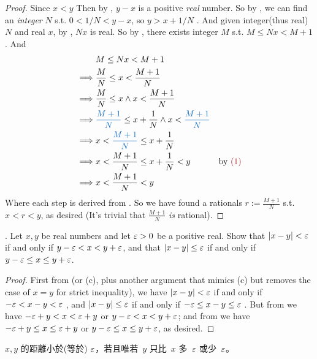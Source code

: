 \begin{proof}
Since \(x < y\) Then by , \(y - x\) is a positive \emph{real} number.
So by , we can find an \emph{integer} \(N\) s.t. \(0 < 1/N < y - x\), so \(y > x + 1/N\) .
And given integer(thus real) \(N\) and real \(x\), by , \(Nx\) is real.
So by , there exists integer \(M\) s.t. \(M \le Nx < M + 1\).
And
\begin{align*}
             & M \le Nx < M + 1 \\
    \implies & \frac{M}{N} \le x < \frac{M + 1}{N} \\
    \implies & \frac{M}{N} \le x \land x < \frac{M + 1}{N} \\
    \implies & \BLUE{\frac{M + 1}{N}} \le x + \frac{1}{N} \land x < \BLUE{\frac{M + 1}{N}} \\
    \implies & x < \BLUE{\frac{M + 1}{N}} \le x + \frac{1}{N} \\
    \implies & x < \frac{M + 1}{N} \le x + \frac{1}{N} < y & \text{by \MAROON{(1)}} \\
    \implies & x < \frac{M + 1}{N} < y
\end{align*}
Where each step is derived from .
So we have found a rationals \(r := \frac{M + 1}{N}\) s.t. \(x < r < y\), as desired (It's trivial that \(\frac{M + 1}{N}\) \emph{is} rational).
\end{proof}

\begin{exercise} \label{exercise 5.4.6}.
Let \(x, y\) be real numbers and let \(\varepsilon > 0\) be a positive real.
Show that \(\lvert x - y\rvert < \varepsilon\) if and only if \(y - \varepsilon < x < y + \varepsilon\),
and that \(\lvert x - y\rvert \le \varepsilon\) if and only if \(y - \varepsilon \le x \le y + \varepsilon\).
\end{exercise}

\begin{proof}
First from  (or (c), plus another argument that mimics (c) but removes the case of \(x = y\) for strict inequality),
we have \(\lvert x - y\rvert < \varepsilon\) if and only if \(-\varepsilon < x - y < \varepsilon\) ,
and \(\lvert x - y\rvert \le \varepsilon\) if and only if \(-\varepsilon \le x - y \le \varepsilon\) .
But from  we have \(-\varepsilon + y < x < \varepsilon + y\) or \(y - \varepsilon < x < y + \varepsilon\);
and from  we have \(-\varepsilon + y \le x \le \varepsilon + y\) or \(y - \varepsilon \le x \le y + \varepsilon\), as desired.
\end{proof}

\begin{note}
\(x, y\) 的距離小於(等於) \(\varepsilon\)，若且唯若\ \(y\) 只比\ \(x\) 多\ \(\varepsilon\) 或少\ \(\varepsilon\)。
\end{note}

